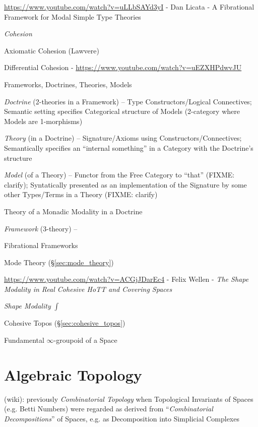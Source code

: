 \url{https://www.youtube.com/watch?v=uLLbSAYd3yI} - Dan Licata - A Fibrational
Framework for Modal Simple Type Theories

\emph{Cohesion}

Axiomatic Cohesion (Lawvere)

Differential Cohesion - \url{https://www.youtube.com/watch?v=uEZXHPdwvJU}

Frameworks, Doctrines, Theories, Models

\emph{Doctrine} (2-theories in a Framework) -- Type Constructors/Logical
Connectives; Semantic setting specifies Categorical structure of Models
(2-category where Models are 1-morphisms)

\emph{Theory} (in a Doctrine) -- Signature/Axioms using
Constructors/Connectives; Semantically specifies an ``internal something'' in a
Category with the Doctrine's structure

\emph{Model} (of a Theory) -- Functor from the Free Category to ``that'' (FIXME:
clarify); Syntatically presented as an implementation of the Signature by some
other Types/Terms in a Theory (FIXME: clarify)

Theory of a Monadic Modality in a Doctrine

\emph{Framework} (3-theory) --

Fibrational Frameworks

Mode Theory (\S\ref{sec:mode_theory})

\url{https://www.youtube.com/watch?v=ACGjJDarEc4} - Felix Wellen - \emph{The
  Shape Modality in Real Cohesive HoTT and Covering Spaces}

\emph{Shape Modality} $\int$

Cohesive Topos (\S\ref{sec:cohesive_topos})

Fundamental $\infty$-groupoid of a Space



\section{Algebraic Topology}\label{sec:algebraic_topology}

(wiki): previously \emph{Combinatorial Topology} when Topological Invariants of
Spaces (e.g. Betti Numbers) were regarded as derived from ``\emph{Combinatorial
  Decompositions}'' of Spaces, e.g. as Decomposition into Simplicial Complexes

